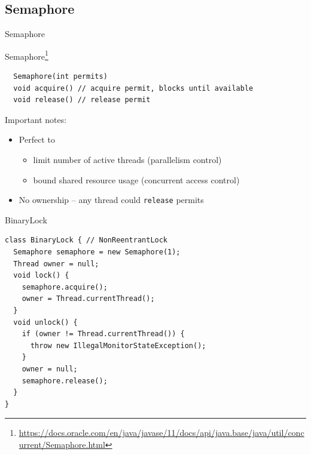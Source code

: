\subsection{Semaphore}
\showTOCSub

\begin{frame}[fragile]{Semaphore}

Semaphore\footnote{\tiny\url{https://docs.oracle.com/en/java/javase/11/docs/api/java.base/java/util/concurrent/Semaphore.html}}

\begin{verbatim}
  Semaphore(int permits)
  void acquire() // acquire permit, blocks until available
  void release() // release permit
\end{verbatim}

Important notes:
\begin{itemize}
    \item Perfect to 
    \begin{itemize}
        \item limit number of active threads (parallelism control) 
        \item bound shared resource usage (concurrent access control)
    \end{itemize}    
    \item No ownership -- any thread could \texttt{release} permits    
\end{itemize}
\end{frame}



\begin{frame}[fragile]{BinaryLock}

\begin{verbatim}
class BinaryLock { // NonReentrantLock
  Semaphore semaphore = new Semaphore(1);
  Thread owner = null;
  void lock() {
    semaphore.acquire();
    owner = Thread.currentThread();
  }
  void unlock() {
    if (owner != Thread.currentThread()) {
      throw new IllegalMonitorStateException();
    }
    owner = null;
    semaphore.release();
  }
}
\end{verbatim}
\end{frame}

